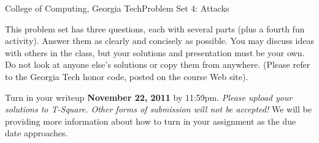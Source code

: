 \documentclass[11pt]{article}
\begin{document}


{College of Computing, Georgia Tech}{Problem Set 4: Attacks}

This problem set has three questions, each with several parts (plus a
fourth fun activity).  Answer them as clearly and concisely as possible.
You may discuss ideas with others in the class, but your solutions and
presentation must be your own.  Do not look at anyone else's solutions
or copy them from anywhere. (Please refer to the Georgia Tech honor
code, posted on the course Web site).

Turn in your writeup {\bf November 22, 2011} by 11:59pm.
{\em Please upload your solutions to T-Square.  Other forms of
  submission will not be accepted!}  We will be providing more
information about how to turn in your assignment as the due date
approaches.
\end{document}
